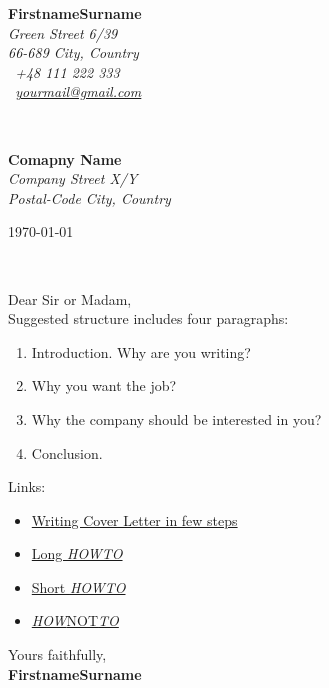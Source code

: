\documentclass[11pt]{article}
\def\firstname{Firstname}
\def\familyname{Surname}
\def\FileAuthor{\firstname\space\familyname}
\begin{document}
\hfill%
\begin{minipage}[t]{.6\textwidth}
\raggedleft%
{\bfseries \FileAuthor}\\[.35ex]
\small\itshape%
Green Street 6/39\\
66-689 City, Country\\[.35ex]
\Mobilefone~+48 111 222 333\\
\Letter~\href{mailto:yourmail@gmail.com}{yourmail@gmail.com}
\end{minipage}\\[1em]
%
\begin{minipage}[t]{.4\textwidth}
\raggedright%
{\bfseries Comapny Name}\\[.35ex]
\small\itshape%
Company Street X/Y\\
Postal-Code City, Country
\end{minipage}
\hfill %
\begin{minipage}[t]{.4\textwidth}
\raggedleft %
\today
\end{minipage}\\[2em]
\raggedright
Dear Sir or Madam,\\[1.5em]

Suggested structure includes four paragraphs:
\begin{enumerate}
	\item{Introduction. Why are you writing?}
	\item{Why you want the job?}
	\item{Why the company should be interested in you?}
	\item{Conclusion.}
\end{enumerate}

Links:
\begin{itemize}
	\item \href{http://www.wikihow.com/Write-a-Cover-Letter}{Writing Cover Letter in few steps}
	\item \href{http://blogs.forbes.com/susanadams/2011/03/24/how-to-write-a-cover-letter/}{Long \textit{HOWTO}}
	\item \href{http://www.jobsite.co.uk/hobsons_articles/grt_cov_letter.html}{Short \textit{HOWTO}}
	\item \href{http://www.kent.ac.uk/careers/cv/coveringletters.htm}{\textit{HOW}NOT\textit{TO}}
\end{itemize}

Yours faithfully,\\[2em] %
%
{\bfseries \FileAuthor}\\
%
\end{document}
